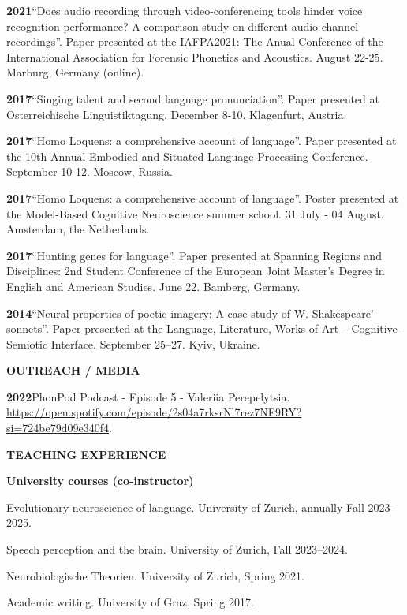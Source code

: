 \documentclass[11pt]{article}
\newcommand{\hangpara}{
 \setlength{\parindent}{0in} %
 \hangindent=0.42in %
}
\begin{document}
\vskip 6pt
\hangpara
{\bf 2021}\hspace{1ex}“Does audio recording through video-conferencing tools hinder voice recognition performance? A comparison study on different audio channel recordings”. Paper presented at the IAFPA2021: The Anual Conference of the International Association for Forensic Phonetics and Acoustics. August 22-25. Marburg, Germany (online).


\vskip 6pt
\hangpara
{\bf 2017}\hspace{1ex}“Singing talent and second language pronunciation”. Paper presented at Österreichische Linguistiktagung. December 8-10. Klagenfurt, Austria.


\vskip 6pt
\hangpara
{\bf 2017}\hspace{1ex}“Homo Loquens: a comprehensive account of language”. Paper presented at the 10th Annual Embodied and Situated Language Processing Conference. September 10-12. Moscow, Russia.


\vskip 6pt
\hangpara
{\bf 2017}\hspace{1ex}“Homo Loquens: a comprehensive account of language”. Poster presented at the Model-Based Cognitive Neuroscience summer school. 31 July - 04 August. Amsterdam, the Netherlands.


\vskip 6pt
\hangpara
{\bf 2017}\hspace{1ex}“Hunting genes for language”. Paper presented at Spanning Regions and Disciplines: 2nd Student Conference of the European Joint Master's Degree in English and American Studies. June 22. Bamberg, Germany.


\vskip 6pt
\hangpara
{\bf 2014}\hspace{1ex}“Neural properties of poetic imagery: A case study of W. Shakespeare’ sonnets”. Paper presented at the Language, Literature, Works of Art – Cognitive-Semiotic Interface. September 25--27. Kyiv, Ukraine.


\vskip 20pt
\begin{flushleft}
{\bf OUTREACH / MEDIA}
\end{flushleft}

\hangpara
{\bf 2022}\hspace{1ex}PhonPod Podcast - Episode 5 - Valeriia Perepelytsia. \url{https://open.spotify.com/episode/2s04a7rksrNl7rez7NF9RY?si=724be79d09e340f4}.



\vskip 20pt
\begin{flushleft}
{\bf TEACHING EXPERIENCE}
\end{flushleft}
\begin{flushleft}
{\bf University courses (co-instructor)}
\end{flushleft}
\hangpara Evolutionary neuroscience of language. University of Zurich, annually Fall 2023--2025.
\vskip 6pt
\hangpara Speech perception and the brain. University of Zurich, Fall 2023--2024.
\vskip 6pt
\hangpara Neurobiologische Theorien. University of Zurich, Spring 2021.
\hangpara Academic writing. University of Graz, Spring 2017.
\end{document}
